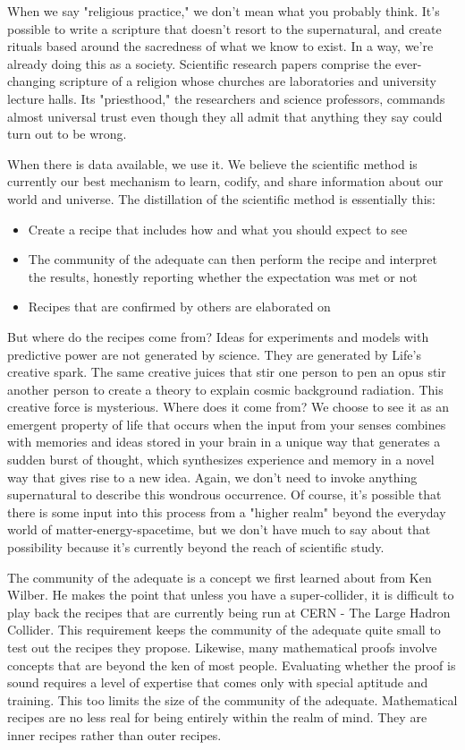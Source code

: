 \documentclass[ebook,12pt,openany,twoside]{memoir}
\begin{document}
When we say "religious practice," we don't mean what you probably think. It's
possible to write a scripture that doesn't resort to the supernatural, and
create rituals based around the sacredness of what we know to exist. In a way,
we're already doing this as a society. Scientific research papers comprise the
ever-changing scripture of a religion whose churches are laboratories and
university lecture halls. Its "priesthood," the researchers and science
professors, commands almost universal trust even though they all admit that
anything they say could turn out to be wrong.

When there is data available, we use it. We believe the scientific method is
currently our best mechanism to learn, codify, and share information about our
world and universe. The distillation of the scientific method is essentially
this:
\begin{itemize}[\textbullet]
\item Create a recipe that includes how and what you should expect to see

\item The community of the adequate can then perform the recipe and interpret
the results, honestly reporting whether the expectation was met or not

\item Recipes that are confirmed by others are elaborated on
\end{itemize}

But where do the recipes come from? Ideas for experiments and models with
predictive power are not generated by science. They are generated by Life's
creative spark. The same creative juices that stir one person to pen an opus
stir another person to create a theory to explain cosmic background radiation.
This creative force is mysterious. Where does it come from? We choose to see it
as an emergent property of life that occurs when the input from your senses
combines with memories and ideas stored in your brain in a unique way that
generates a sudden burst of thought, which synthesizes experience and memory in
a novel way that gives rise to a new idea. Again, we don't need to invoke
anything supernatural to describe this wondrous occurrence. Of course, it's
possible that there is some input into this process from a "higher realm"
beyond the everyday world of matter-energy-spacetime, but we don't have much to
say about that possibility because it's currently beyond the reach of
scientific study.

The community of the adequate is a concept we first learned about from Ken
Wilber. He makes the point that unless you have a super-collider, it is
difficult to play back the recipes that are currently being run at CERN - The
Large Hadron Collider. This requirement keeps the community of the adequate
quite small to test out the recipes they propose. Likewise, many mathematical
proofs involve concepts that are beyond the ken of most people. Evaluating
whether the proof is sound requires a level of expertise that comes only with
special aptitude and training. This too limits the size of the community of the
adequate. Mathematical recipes are no less real for being entirely within the
realm of mind. They are inner recipes rather than outer recipes.
\end{document}
